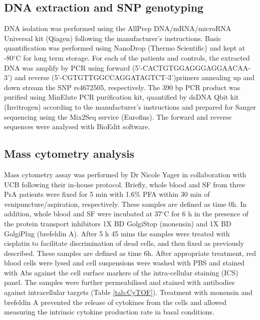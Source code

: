 \subsection{DNA extraction and SNP genotyping}
DNA isolation was performed using the AllPrep DNA/mRNA/microRNA Universal kit (Qiagen) following the manufacturer's instructions. Basic quantification was performed using NanoDrop (Thermo Scientific) and kept at -80{$^\circ$}C for long term storage. For each of the patients and controls, the extracted DNA was amplify by PCR using forward (5'-CACTGTGGAGGGAGGAACAA-3') and reverse (5'-CGTGTTGGCCAGGATAGTCT-3')primers annealing up and down stream the SNP rs4672505, respectively. The 390 bp PCR product was purified using MinElute PCR purification kit, quantified by dsDNA Qbit kit (Invitrogen) according to the manufacturer's instructions and prepared for Sanger sequencing using the Mix2Seq service (Eurofins). The forward and reverse sequences were analysed with BioEdit software.



\subsection{Mass cytometry analysis}
Mass cytometry assay was performed by Dr Nicole Yager in collaboration with UCB following their in-house protocol. Briefly, whole blood and SF from three PsA patients were fixed for 5 min with 1.6\% PFA within 30 min of venipuncture/aspiration, respectively. These samples are defined as time 0h. In addition, whole blood and SF were incubated at 37{$^\circ$}C for 6 h in the presence of the protein transport inhibitors 1X BD GolgiStop (monensin) and 1X BD GolgiPlug (brefeldin A). After 5 h 45 mins the samples were treated with cisplatin to facilitate discrimination of dead cells, and then fixed as previously described.  These samples are defined as time 6h. After appropriate treatment, red blood cells were lysed and cell suspensions were washed with PBS and stained with Abs against the cell surface markers of the intra-cellular staining (ICS) panel.  The samples were further permeabilised and stained with antibodies against intracellular targets (Table \ref{tab:CyTOF}). Treatment with monensin and brefeldin A prevented the release of cytokines from the cells and allowed measuring the intrinsic cytokine production rate in basal conditions. 


